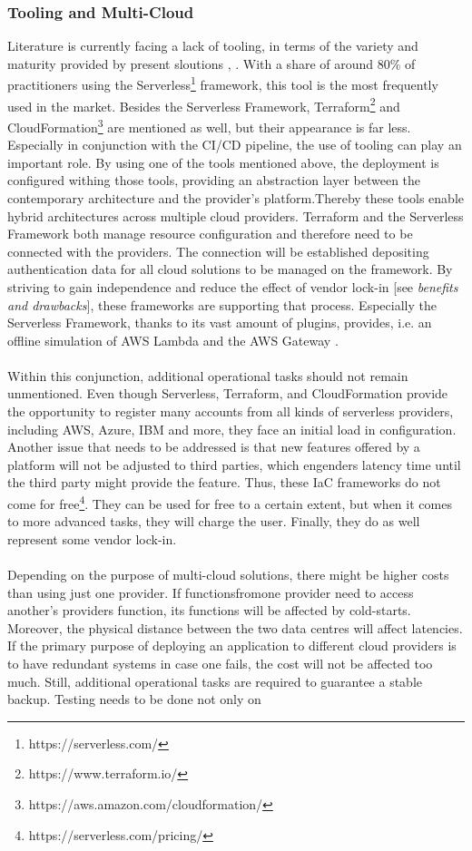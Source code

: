 \documentclass[a4paper,11pt, pagesize]{scrartcl}
\begin{document}
\begin{spacing}{1.2}
\subsubsection{Tooling and Multi-Cloud}
Literature is currently facing a lack of tooling, in terms of the variety and maturity provided by present sloutions \cite{Yussupov2019_SystematicMappingStudyFaaS}, \cite{leitner2019mixed}. With a share of around 80\% \cite{leitner2019mixed} of practitioners using the Serverless\footnote{https://serverless.com/} framework, this tool is the most frequently used in the market. Besides the Serverless Framework, Terraform\footnote{https://www.terraform.io/} and CloudFormation\footnote{https://aws.amazon.com/cloudformation/} are mentioned as well, but their appearance is far less. Especially in conjunction with the CI/CD pipeline, the use of tooling can play an important role. By using one of the tools mentioned above, the deployment is configured withing those tools, providing an abstraction layer between the contemporary architecture and the provider's platform.Thereby these tools enable hybrid architectures across multiple cloud providers. Terraform and the Serverless Framework both manage resource configuration and therefore need to be connected with the providers. The connection will be established depositing authentication data for all cloud solutions to be managed on the framework. By striving to gain independence and reduce the effect of vendor lock-in [see \textit{benefits and drawbacks}], these frameworks are supporting that process. Especially the Serverless Framework, thanks to its vast amount of plugins, provides, i.e. an offline simulation of AWS Lambda and the AWS Gateway \cite{lin2018tracking}.\\\\ Within this conjunction, additional operational tasks should not remain unmentioned. Even though Serverless, Terraform, and CloudFormation provide the opportunity to register many accounts from all kinds of serverless providers, including AWS, Azure, IBM and more, they face an initial load in configuration. Another issue that needs to be addressed is that new features offered by a platform will not be adjusted to third parties, which engenders latency time until the third party might provide the feature. Thus, these IaC frameworks do not come for free\footnote{https://serverless.com/pricing/}. They can be used for free to a certain extent, but when it comes to more advanced tasks, they will charge the user. Finally, they do as well represent some vendor lock-in.\\\\ Depending on the purpose of multi-cloud solutions, there might be higher costs than using just one provider. If functionsfromone provider need to access another's providers function, its functions will be affected by cold-starts. Moreover, the physical distance between the two data centres will affect latencies. If the primary purpose of deploying an application to different cloud providers is to have redundant systems in case one fails, the cost will not be affected too much. Still, additional operational tasks are required to guarantee a stable backup. Testing needs to be done not only on 
\end{spacing}
\end{document}
